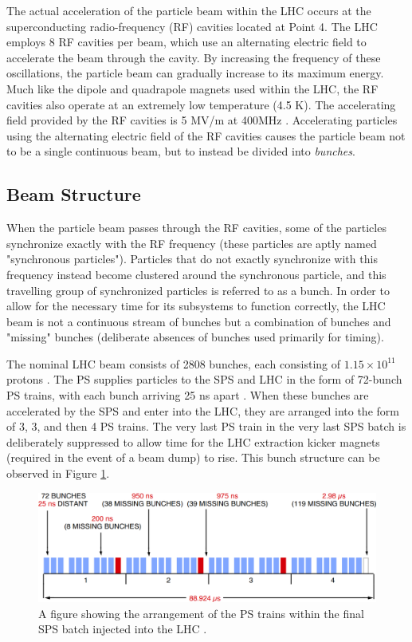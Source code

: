 \documentclass[12pt,a4paper,epsf,portrait,times,epsfig]{report}
\begin{document}
		The actual acceleration of the particle beam within the LHC occurs at the superconducting radio-frequency (RF) cavities located at Point 4. The LHC employs 8 RF cavities per beam, which use an alternating electric field to accelerate the beam through the cavity. By increasing the frequency of these oscillations, the particle beam can gradually increase to its maximum energy. Much like the dipole and quadrapole magnets used within the LHC, the RF cavities also operate at an extremely low temperature (4.5 K). The accelerating field provided by the RF cavities is 5 MV/m at 400MHz \cite{LHCRF}. Accelerating particles using the alternating electric field of the RF cavities causes the particle beam not to be a single continuous beam, but to instead be divided into \textit{bunches}.
		
		\subsection{Beam Structure}
		

		When the particle beam passes through the RF cavities, some of the particles synchronize exactly with the RF frequency (these particles are aptly named "synchronous particles"). Particles that do not exactly synchronize with this frequency instead become clustered around the synchronous particle, and this travelling group of synchronized particles is referred to as a bunch. In order to allow for the necessary time for its subsystems to function correctly, the LHC beam is not a continuous stream of bunches but a combination of bunches and "missing" bunches (deliberate absences of bunches used primarily for timing). \par

		The nominal LHC beam consists of 2808 bunches, each consisting of $1.15 \times 10^{11}$ protons \cite{LHCDesignV1,LHCDesignV3}. The PS supplies particles to the SPS and LHC in the form of 72-bunch PS trains, with each bunch arriving 25 ns apart \cite{LHCBeam}. When these bunches are accelerated by the SPS and enter into the LHC, they are arranged into the form of 3, 3, and then 4 PS trains. The very last PS train in the very last SPS batch is deliberately suppressed to allow time for the LHC extraction kicker magnets (required in the event of a beam dump) to rise. This bunch structure can be observed in Figure \ref{Fig:LHCBunches}. 

		\begin{figure}
			\centering
			\includegraphics[scale=0.3]{LHC_Beam_Structure}
			\caption{A figure showing the arrangement of the PS trains within the final SPS batch injected into the LHC \cite{LHCBunches}.}
			\label{Fig:LHCBunches}
		\end{figure}
\end{document}
